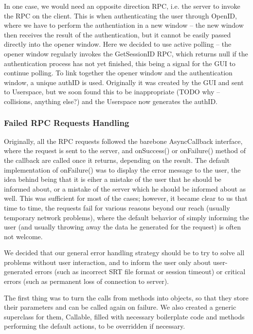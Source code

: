 In one case, we would need an opposite direction RPC, i.e. the server to invoke the RPC on the client. This is when authenticating the user through OpenID, where we have to perform the authentiation in a new window -- the new window then receives the result of the authentication, but it cannot be easily passed directly into the opener window. Here we decided to use active polling -- the opener window regularly invokes the GetSessionID RPC, which returns null if the authentication process has not yet finished, this being a signal for the GUI to continue polling. To link together the opener window and the authentication window, a unique authID is used. Originally it was created by the GUI and sent to Userspace, but we soon found this to be inappropriate (TODO why -- collisions, anything else?) and the Userspace now generates the authID.

\subsubsection{Failed RPC Requests Handling}

Originally, all the RPC requests followed the barebone AsyncCallback interface, where the request is sent to the server, and onSuccess() or onFailure() method of the callback are called once it returns, depending on the result. The default implementation of onFailure() was to display the error message to the user, the idea behind being that it is eiher a mistake of the user that he should be informed about, or a mistake of the server which he should be informed about as well. This was sufficient for most of the cases; however, it became clear to us that time to time, the requests fail for various reasons beyond our reach (usually temporary network problems), where the default behavior of simply informing the user (and usually throwing away the data he generated for the request) is often not welcome.

We decided that our general error handling strategy should be to try to solve all problems without user interaction, and to inform the user only about user-generated errors (such as incorrect SRT file format or session timeout) or critical errors (such as permanent loss of connection to server).

The first thing was to turn the calls from methods into objects, so that they store their parameters and can be called again on failure. We also created a generic superclass for them, Callable, filled with necessary boilerplate code and methods performing the default actions, to be overridden if necessary.

